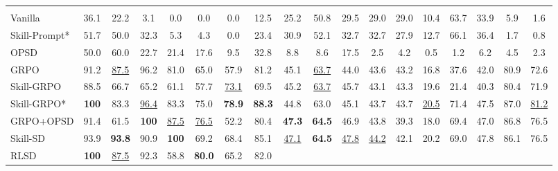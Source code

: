 \documentclass{llmxive}
\begin{document}
\begin{table}[t]
{\begin{tabular}{l CCCCCCC CCCCCCCC CC }
    \midrule

      \\

    Vanilla
        & 36.1 & 22.2 & 3.1 & 0.0 & 0.0 & 0.0 & 12.5
        & 25.2 & 50.8 & 29.5 & 29.0 & 29.0 & 10.4 & 63.7 & 33.9
        & 5.9 & 1.6
        \\
    Skill-Prompt*
        & 51.7 & 50.0 & 32.3 & 5.3 & 4.3 & 0.0 & 23.4
        & 30.9 & 52.1 & 32.7 & 32.7 & 27.9 & 12.7 & 66.1 & 36.4
        & 1.7 & 0.8
        \\
    OPSD
        & 50.0 & 60.0 & 22.7 & 21.4 & 17.6 & 9.5 & 32.8
        & 8.8 & 8.6 & 17.5 & 2.5 & 4.2 & 0.5 & 1.2 & 6.2
        & 4.5 & 2.3
        \\

    GRPO
        & 91.2 & \underline{87.5} & 96.2 & 81.0 & 65.0 & 57.9 & 81.2
        & 45.1 & \underline{63.7} & 44.0 & 43.6 & 43.2 & 16.8 & 37.6 & 42.0
        & 80.9 & 72.6
        \\
    Skill-GRPO
        & 88.5 & 66.7 & 65.2 & 61.1 & 57.7 & \underline{73.1} & 69.5
        & 45.2 & \underline{63.7} & 45.7 & 43.1 & 43.3 & 19.6 & 21.4 & 40.3
        & 80.4 & 71.9
        \\
    Skill-GRPO*
        & \textbf{100} & 83.3 & \underline{96.4} & 83.3 & 75.0 & \textbf{78.9} & \textbf{88.3}
        & 44.8 & 63.0 & 45.1 & 43.7 & 43.7 & \underline{20.5} & 71.4 & 47.5
        & 87.0 & \underline{81.2}
        \\
    GRPO+OPSD
        & 91.4 & 61.5 & \textbf{100} & \underline{87.5} & \underline{76.5} & 52.2 & 80.4
        & \textbf{47.3} & \textbf{64.5} & 46.9 & 43.8 & 39.3 & 18.0 & 69.4 & 47.0
        & 86.8 & 76.5
        \\
    Skill-SD
        & 93.9 & \textbf{93.8} & 90.9 & \textbf{100} & 69.2 & 68.4 & 85.1
        & \underline{47.1} & \textbf{64.5} & \underline{47.8} & \underline{44.2} & 42.1 & 20.2 & 69.0 & 47.8
        & 86.1 & 76.5
        \\
    RLSD
        & \textbf{100} & \underline{87.5} & 92.3 & 58.8 & \textbf{80.0} & 65.2 & 82.0

\end{tabular}}
\end{table}
\end{document}
